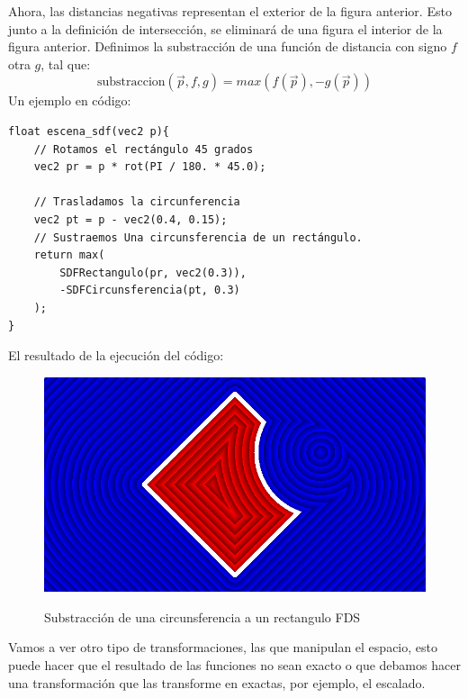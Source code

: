 Ahora, las distancias negativas representan el exterior de la figura anterior. Esto junto a la definición de intersección, se eliminará de una figura el interior de la figura anterior. Definimos la substracción de una función de distancia con signo \(f\) otra \(g\), tal que:
\[\text{substraccion}(\Vec{p}, f,g)=max(f(\Vec{p}), -g(\Vec{p}))\]
Un ejemplo en código:
\begin{lstlisting}
float escena_sdf(vec2 p){
    // Rotamos el rectángulo 45 grados
    vec2 pr = p * rot(PI / 180. * 45.0);
    
    // Trasladamos la circunferencia
    vec2 pt = p - vec2(0.4, 0.15);
    // Sustraemos Una circunsferencia de un rectángulo.
    return max(
        SDFRectangulo(pr, vec2(0.3)),
        -SDFCircunsferencia(pt, 0.3)
    );
}
\end{lstlisting}
El resultado de la ejecución del código:
\begin{figure}[H]
  \centering
  \captionsetup{justification=centering}%
  \includegraphics[width=1.0\textwidth]{secciones/imagenes/sdf/2d/sdf_subtract-3.png}\label{fig:substraction}
  \caption{Substracción de una circunsferencia a un rectangulo FDS}
\end{figure}

Vamos a ver otro tipo de transformaciones, las que manipulan el espacio, esto puede hacer que el resultado de las funciones no sean exacto o que debamos hacer una transformación que las transforme en exactas, por ejemplo, el escalado.

